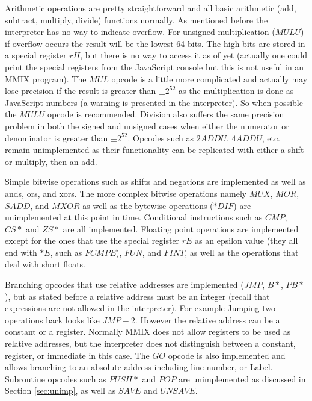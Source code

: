 \documentclass[conference]{IEEEtran}
\begin{document}
Arithmetic operations are pretty straightforward and all basic arithmetic (add, subtract, multiply, divide) functions normally. As mentioned before the interpreter has no way to indicate overflow. For unsigned multiplication ($MULU$) if overflow occurs the result will be the lowest 64 bits. The high bits are stored in a special register $rH$, but there is no way to access it as of yet (actually one could print the special registers from the JavaScript console but this is not useful in an MMIX program). The $MUL$ opcode is a little more complicated and actually may lose precision if the result is greater than $\pm 2^{52}$ as the multiplication is done as JavaScript numbers (a warning is presented in the interpreter). So when possible the $MULU$ opcode is recommended. Division also suffers the same precision problem in both the signed and unsigned cases when either the numerator or denominator is greater than $\pm 2^{52}$. Opcodes such as $2ADDU$, $4ADDU$, etc. remain unimplemented as their functionality can be replicated with either a shift or multiply, then an add. 

Simple bitwise operations such as shifts and negations are implemented as well as ands, ors, and xors. The more complex bitwise operations namely $MUX$, $MOR$, $SADD$, and $MXOR$ as well as the bytewise operations ($*DIF$) are unimplemented at this point in time. Conditional instructions such as $CMP$, $CS*$ and $ZS*$ are all implemented. Floating point operations are implemented except for the ones that use the special register $rE$ as an epsilon value (they all end with $*E$, such as $FCMPE$), $FUN$, and $FINT$, as well as the operations that deal with short floats.

Branching opcodes that use relative addresses are implemented ($JMP$, $B*$, $PB*$),  but as stated before a relative address must be an integer (recall that expressions are not allowed in the interpreter). For example Jumping two operations back looks like $JMP -2$. However the relative address can be a constant or a register. Normally MMIX does not allow registers to be used as relative addresses, but the interpreter does not distinguish between a constant, register, or immediate in this case. The $GO$ opcode is also implemented and allows branching to an absolute address including line number, or Label. Subroutine opcodes such as $PUSH*$ and $POP$ are unimplemented as discussed in Section \ref{sec:unimp}, as well as $SAVE$ and $UNSAVE$.
\end{document}
